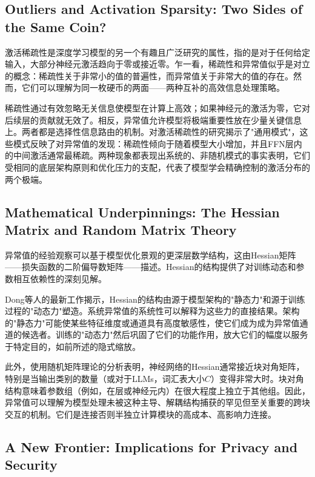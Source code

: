 \documentclass{article}
\begin{document}
\subsection{Outliers and Activation Sparsity: Two Sides of the Same Coin?}

激活稀疏性是深度学习模型的另一个有趣且广泛研究的属性，指的是对于任何给定输入，大部分神经元激活趋向于零或接近零。乍一看，稀疏性和异常值似乎是对立的概念：稀疏性关于非常小的值的普遍性，而异常值关于非常大的值的存在。然而，它们可以理解为同一枚硬币的两面——两种互补的高效信息处理策略。

稀疏性通过有效忽略无关信息使模型在计算上高效；如果神经元的激活为零，它对后续层的贡献就无效了。相反，异常值允许模型将极端重要性放在少量关键信息上。两者都是选择性信息路由的机制。对激活稀疏性的研究揭示了"通用模式"，这些模式反映了对异常值的发现：稀疏性倾向于随着模型大小增加，并且FFN层内的中间激活通常最稀疏。两种现象都表现出系统的、非随机模式的事实表明，它们受相同的底层架构原则和优化压力的支配，代表了模型学会精确控制的激活分布的两个极端。

\subsection{Mathematical Underpinnings: The Hessian Matrix and Random Matrix Theory}

异常值的经验观察可以基于模型优化景观的更深层数学结构，这由Hessian矩阵——损失函数的二阶偏导数矩阵——描述。Hessian的结构提供了对训练动态和参数相互依赖性的深刻见解。

Dong等人\cite{dong2025hessian}的最新工作揭示，Hessian的结构由源于模型架构的"静态力"和源于训练过程的"动态力"塑造。系统异常值的系统性可以解释为这些力的直接结果。架构的"静态力"可能使某些特征维度或通道具有高度敏感性，使它们成为成为异常值通道的候选者。训练的"动态力"然后巩固了它们的功能作用，放大它们的幅度以服务于特定目的，如前所述的隐式缩放。

此外，使用随机矩阵理论的分析表明，神经网络的Hessian通常接近块对角矩阵，特别是当输出类别的数量（或对于LLMs，词汇表大小$C$）变得非常大时。块对角结构意味着参数组（例如，在层或神经元内）在很大程度上独立于其他组。因此，异常值可以理解为模型处理未被这种主导、解耦结构捕获的罕见但至关重要的跨块交互的机制。它们是连接否则半独立计算模块的高成本、高影响力连接。

\subsection{A New Frontier: Implications for Privacy and Security}
\end{document}
